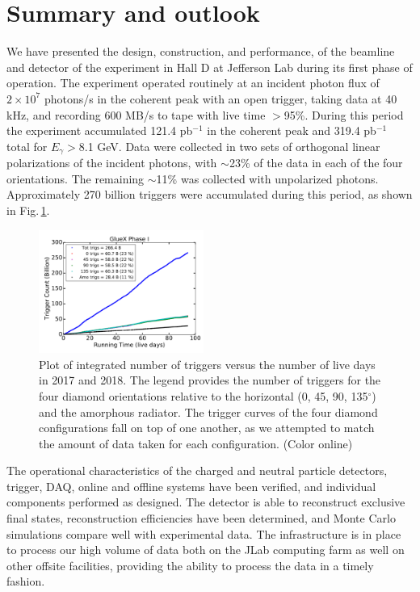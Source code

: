 
\section{Summary and outlook\label{sec:summary} }
We have presented the design, construction, and performance, of the beamline and detector of the \gx{} experiment in Hall D at Jefferson Lab during its first phase of operation. The experiment operated routinely at an incident photon flux of $2\times 10^{7}$ photons/s in the coherent peak with an open trigger, taking data at 40 kHz, and recording 600 MB/s to tape with live time $>$95\%. During this period the experiment accumulated  121.4 pb$^{-1}$ in the coherent peak and 319.4 pb$^{-1}$ total for $E_\gamma>$8.1 GeV. Data were collected in two sets of orthogonal linear polarizations of the incident photons, with $\sim$23\% of the data in each of the four orientations. The remaining $\sim$11\% was collected with unpolarized photons. Approximately 270 billion triggers were accumulated during this period, as shown in Fig.\,\ref{fig:plot_rcdb3_phaseI}.  

\begin{figure}[tbh]\centering
\includegraphics[width=0.48\textwidth]{figures/plot_rcdb3_phaseI.pdf}
\caption{\label{fig:plot_rcdb3_phaseI} 
Plot of integrated number of triggers versus the number of live days in 2017 and 2018. The legend provides the number of triggers for the four diamond orientations relative to the horizontal (0, 45, 90, 135$^\circ$) and the amorphous radiator. The trigger curves of the four diamond configurations fall on top of one another, as we attempted to match the amount of data taken for each configuration. 
(Color online)    
 }   
\end{figure}     

The operational characteristics of the charged and neutral particle detectors, trigger, DAQ, online and offline systems have been verified, and individual components performed as designed. The detector is able to reconstruct exclusive final states, reconstruction efficiencies have been determined, and Monte Carlo simulations compare well with experimental data. The infrastructure is in place to process our high volume of data both on the JLab computing farm as well on other offsite facilities, providing the ability to process the data in a timely fashion.

